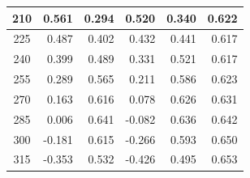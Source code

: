 \begin{table}[htbp]
\begin{center}
\begin{tabular}{|p{20mm}|p{20mm}|p{20mm}|p{20mm}|p{20mm}|p{20mm}|}
      \multicolumn{1}{|c|}{210}                     & \multicolumn{1}{|r|}{0.561}                & \multicolumn{1}{|r|}{0.294}                & \multicolumn{1}{|r|}{0.520}                & \multicolumn{1}{|r|}{0.340}                & \multicolumn{1}{|r|}{0.622}                    \\ \hline
      \multicolumn{1}{|c|}{225}                     & \multicolumn{1}{|r|}{0.487}                & \multicolumn{1}{|r|}{0.402}                & \multicolumn{1}{|r|}{0.432}                & \multicolumn{1}{|r|}{0.441}                & \multicolumn{1}{|r|}{0.617}                    \\ \hline
      \multicolumn{1}{|c|}{240}                     & \multicolumn{1}{|r|}{0.399}                & \multicolumn{1}{|r|}{0.489}                & \multicolumn{1}{|r|}{0.331}                & \multicolumn{1}{|r|}{0.521}                & \multicolumn{1}{|r|}{0.617}                    \\ \hline
      \multicolumn{1}{|c|}{255}                     & \multicolumn{1}{|r|}{0.289}                & \multicolumn{1}{|r|}{0.565}                & \multicolumn{1}{|r|}{0.211}                & \multicolumn{1}{|r|}{0.586}                & \multicolumn{1}{|r|}{0.623}                    \\ \hline
      \multicolumn{1}{|c|}{270}                     & \multicolumn{1}{|r|}{0.163}                & \multicolumn{1}{|r|}{0.616}                & \multicolumn{1}{|r|}{0.078}                & \multicolumn{1}{|r|}{0.626}                & \multicolumn{1}{|r|}{0.631}                    \\ \hline
      \multicolumn{1}{|c|}{285}                     & \multicolumn{1}{|r|}{0.006}                & \multicolumn{1}{|r|}{0.641}                & \multicolumn{1}{|r|}{-0.082}               & \multicolumn{1}{|r|}{0.636}                & \multicolumn{1}{|r|}{0.642}                    \\ \hline
      \multicolumn{1}{|c|}{300}                     & \multicolumn{1}{|r|}{-0.181}               & \multicolumn{1}{|r|}{0.615}                & \multicolumn{1}{|r|}{-0.266}               & \multicolumn{1}{|r|}{0.593}                & \multicolumn{1}{|r|}{0.650}                    \\ \hline
      \multicolumn{1}{|c|}{315}                     & \multicolumn{1}{|r|}{-0.353}               & \multicolumn{1}{|r|}{0.532}                & \multicolumn{1}{|r|}{-0.426}               & \multicolumn{1}{|r|}{0.495}                & \multicolumn{1}{|r|}{0.653}                    \\ \hline

\end{tabular}
\end{center}
\end{table}
